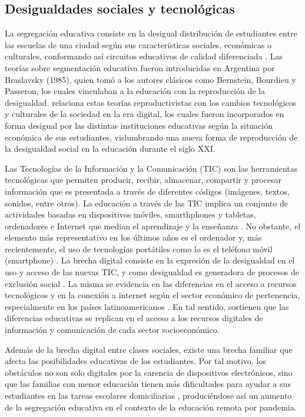 \documentclass[spanish]{textolivre}
\begin{document}
\subsection{Desigualdades sociales y tecnológicas}\label{sec-conduta}
La segregación educativa consiste en la desigual distribución de estudiantes entre las escuelas de una ciudad según sus características sociales, económicas o culturales, conformando así circuitos educativos de calidad diferenciada \cite{kruger_efectos_2020}. Las teorías sobre segmentación educativa fueron introducidas en Argentina por Braslavsky (1985), quien tomó a los autores clásicos como Bernstein, Bourdieu y Passeron, los cuales vinculaban a la educación con la reproducción de la desigualdad. \textcite{tobena_cambio_2019} relaciona estas teorías reproductivistas con los cambios tecnológicos y culturales de la sociedad en la era digital, los cuales fueron incorporados en forma desigual por las distintas instituciones educativas según la situación económica de sus estudiantes, vislumbrando una nueva forma de reproducción de la desigualdad social en la educación durante el siglo XXI.

Las Tecnologías de la Información y la Comunicación (TIC) son las herramientas tecnológicas que permiten producir, recibir, almacenar, compartir y procesar información que es presentada a través de diferentes códigos (imágenes, textos, sonidos, entre otros). La educación a través de las TIC implica un conjunto de actividades basadas en dispositivos móviles, smarthphones y tabletas, ordenadores e Internet que median el aprendizaje y la enseñanza \cite{torras_virgili_emergency_2021}. No obstante, el elemento más representativo en los últimos años es el ordenador y, más recientemente, el uso de tecnologías portátiles como lo es el teléfono móvil (smartphone) \cite{camacho_tic:_2018}. La brecha digital consiste en la expresión de la desigualdad en el uso y acceso de las nuevas TIC, y como desigualdad es generadora de procesos de exclusión social \cite{martinez_lopez_brecha_2020}. La misma se evidencia en las diferencias en el acceso a recursos tecnológicos y en la conexión a internet según el sector económico de pertenencia, especialmente en los países latinoamericanos \cite{comision_economica_para_america_latina_y_el_caribe_cepal_covid-19_2020}. En tal sentido, \textcite{formichella_pandemia_2020} sostienen que las diferencias educativas se replican en el acceso a los recursos digitales de información y comunicación de cada sector socioeconómico.

Además de la brecha digital entre clases sociales, existe una brecha familiar que afecta las posibilidades educativas de los estudiantes. Por tal motivo, los obstáculos no son solo digitales por la carencia de dispositivos electrónicos, sino que las familias con menor educación tienen más dificultades para ayudar a sus estudiantes en las tareas escolares domiciliarias \cite{alderete_2020}, produciéndose así un aumento de la segregación educativa en el contexto de la educación remota por pandemia.
\end{document}
